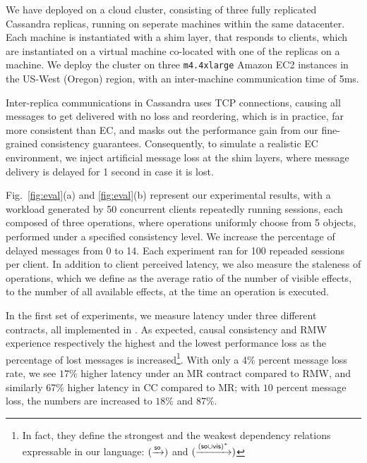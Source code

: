 We have deployed \tool on a cloud cluster,
consisting of three fully replicated Cassandra replicas, running on
seperate machines within the same
datacenter. 
Each machine is instantiated with a
\tool shim layer, that responds to clients,  
 which are instantiated on a virtual machine 
co-located with one of the replicas on a machine.
We deploy the cluster on three \texttt{m4.4xlarge} Amazon EC2 instances
in the US-West (Oregon) region, with an inter-machine communication time of 5ms.

Inter-replica communications in Cassandra uses TCP connections,
causing all messages to get delivered with no loss and reordering,
which is in practice, far more consistent than EC, and masks out the
performance gain from our fine-grained consistency guarantees.
Consequently, to simulate a realistic EC environment, we inject
artificial message loss at the shim layers, where message delivery is
delayed for 1 second in case it is lost.

Fig.~\ref{fig:eval}(a) and \ref{fig:eval}(b) represent
our experimental results, with a workload generated 
by 50 concurrent clients repeatedly running sessions, each composed of three
operations, where operations uniformly choose from 5 objects,
performed under a specified consistency level. 
We increase the
percentage of delayed messages from 0 to 14.  Each experiment ran for
100 repeaded sessions per client. In addition to client perceived
latency, we also measure the staleness of operations, which we define as
the average ratio of the number of visible effects,
to the number of all available effects, at the time an operation is executed.

In the first set of experiments, we measure latency under
three different \LB{} contracts, all implemented in \tool. As
expected,
causal consistency and RMW experience respectively the highest and the
lowest
performance loss as the percentage of lost messages is increased\footnote{In fact, 
they define the strongest and the weakest
\LB{} dependency relations expressable in our language:
$(\xrightarrow{{\textsf{so}}})$ and $(\xrightarrow{({\textsf{so}}\cup{\normalfont \textsf{vis}})^*})$}.
With only a 4\% percent message loss rate, we see $17\%$ higher latency under an MR
contract compared to RMW, and similarly 67\% higher latency in CC
compared to MR; with $10$ percent message loss, the numbers are
increased to $18\%$ and $87\%$.


